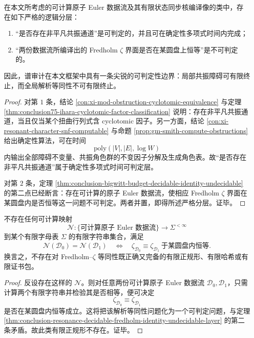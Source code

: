 \begin{theorem}\label{thm:conclusion-resonance-decidable-fredholm-identity-undecidable-layer}
在本文所考虑的可计算原子 Euler 数据流及其有限状态同步核编译像的类中，存在如下严格的逻辑分层：
\begin{enumerate}
  \item “是否存在非平凡共振通道”是可判定的，并且可在确定性多项式时间内完成；
  \item “两份数据流所编译出的 Fredholm \(\zeta\) 界面是否在某圆盘上恒等”是不可判定的。
\end{enumerate}
因此，谱审计在本文框架中具有一条尖锐的可判定性边界：局部共振障碍可有限终止，而全局解析等同性不可有限终止。
\end{theorem}
\begin{proof}
对第 \(1\) 条，结论 \ref{con:xi-mod-obstruction-cyclotomic-equivalence} 与定理 \ref{thm:conclusion75-ihara-cyclotomic-factor-classification} 说明：存在非平凡共振通道，当且仅当某个扭曲行列式含 cyclotomic 因子。另一方面，结论 \ref{con:xi-resonant-character-snf-computable} 与命题 \ref{prop:gm-smith-compute-obstructions} 给出确定性算法，可在时间
\[
\mathrm{poly}(|V|,|E|,\log W)
\]
内输出全部障碍不变量、共振角色群的不变因子分解及生成角色表。故“是否存在非平凡共振通道”属于确定性多项式时间可判定层。

对第 \(2\) 条，定理 \ref{thm:conclusion-bigwitt-budget-decidable-identity-undecidable} 的第二点已经断言：存在可计算的原子 Euler 数据流，使相应 Fredholm \(\zeta\) 界面在某圆盘内是否恒等这一问题不可判定。两者并置，即得所述严格分层。证毕。
\end{proof}

\begin{corollary}\label{cor:conclusion-no-finite-normal-form-for-fredholm-zeta-identity}
不存在任何可计算映射
\[
\mathcal N:\{\text{可计算原子 Euler 数据流}\}\longrightarrow \Sigma^{<\infty}
\]
到某个有限字母表 \(\Sigma\) 的有限字符串集合，满足
\[
\mathcal N(\mathcal D_0)=\mathcal N(\mathcal D_1)
\quad\Longleftrightarrow\quad
\zeta_{\mathcal D_0}\equiv \zeta_{\mathcal D_1}
\ \text{于某圆盘内恒等}.
\]
换言之，不存在对 Fredholm--\(\zeta\) 等同性既正确又完备的有限正规形、有限哈希或有限证书包。
\end{corollary}
\begin{proof}
反设存在这样的 \(\mathcal N\)。则对任意两份可计算原子 Euler 数据流 \(\mathcal D_0,\mathcal D_1\)，只需计算两个有限字符串并检验其是否相等，便可决定
\[
\zeta_{\mathcal D_0}\equiv \zeta_{\mathcal D_1}
\]
是否在某圆盘内恒等成立。这将把该解析等同性问题化为一个可判定问题，与定理 \ref{thm:conclusion-resonance-decidable-fredholm-identity-undecidable-layer} 的第二条矛盾。故此类有限正规形不存在。证毕。
\end{proof}
